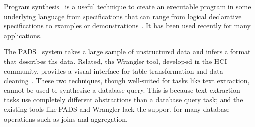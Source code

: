 





Program synthesis~\cite{Gulwani:2010:DPS} is a useful
technique to create an executable program
in some underlying language from specifications that can range
from logical declarative specifications to examples or
demonstrations~\cite{Harris:2011, singh:2012, Gulwani:2011,
Kandel:2011, Fisher08Pads,Lau:2003:PDU, Lau:2000:VSA, Barbosa:2010:MLA, Arasu:2009:LST}.
It has been used recently for many applications.


The PADS~\cite{Fisher:2008} system takes a large sample
of unstructured data and infers a
format that describes the data. Related,
the Wrangler tool, developed in the HCI community,
provides a visual interface for table transformation
and data cleaning~\cite{Kandel:2011}.
These two techniques, though well-suited for tasks
like text extraction, cannot be used to 
synthesize a database query.
This is because text extraction tasks
use completely different abstractions than a database query task;
and the existing tools like PADS and Wrangler lack the support for many database operations
such as joins and aggregation.

